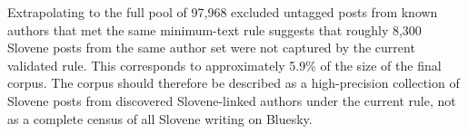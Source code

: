 Extrapolating to the full pool of 97,968 excluded untagged posts from known authors that met the same minimum-text rule suggests that roughly 8,300 Slovene posts from the same author set were not captured by the current validated rule. This corresponds to approximately 5.9\% of the size of the final corpus. The corpus should therefore be described as a high-precision collection of Slovene posts from discovered Slovene-linked authors under the current rule, not as a complete census of all Slovene writing on Bluesky.
